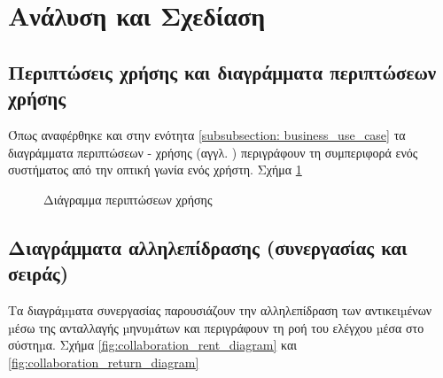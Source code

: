 \documentclass{assignment}
\begin{document}
\section{Ανάλυση και Σχεδίαση}

\subsection{Περιπτώσεις χρήσης και διαγράμματα περιπτώσεων χρήσης}

Όπως αναφέρθηκε και στην ενότητα \ref{subsubsection: business_use_case} τα διαγράμματα περιπτώσεων - χρήσης (αγγλ. ) περιγράφουν τη συμπεριφορά ενός συστήματος από την οπτική γωνία ενός χρήστη. Σχήμα \ref{fig:Use_case_Diagram}

\begin{landscape}
\begin{figure}
\begin{center}
\caption{Διάγραμμα περιπτώσεων χρήσης}
\label{fig:Use_case_Diagram}
\end{center}
\end{figure}
\end{landscape}



\subsection{Διαγράμματα αλληλεπίδρασης (συνεργασίας και σειράς)}

Τα διαγράµµατα συνεργασίας παρουσιάζουν την αλληλεπίδραση των αντικειµένων µέσω της ανταλλαγής µηνυµάτων και περιγράφουν τη ροή του ελέγχου µέσα στο σύστηµα. Σχήμα \ref{fig:collaboration_rent_diagram} και \ref{fig:collaboration_return_diagram}
\end{document}

